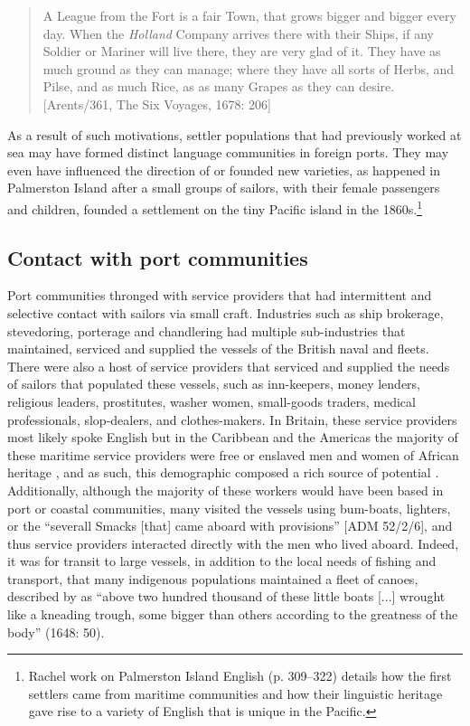 \begin{quotation}
A League from the Fort is a fair Town, that grows bigger and bigger every day. When the \textit{Holland} Company arrives there with their Ships, if any Soldier or Mariner will live there, they are very glad of it. They have as much ground as they can manage; where they have all sorts of Herbs, and Pilse, and as much Rice, as as many Grapes as they can desire. [Arents/361, The Six {Voyages, 1678}: 206]
\end{quotation}

As a result of such motivations, settler populations that had previously worked at sea may have formed distinct language communities in foreign ports. They may even have influenced the direction of  or founded new varieties, as happened in Palmerston Island after a small groups of sailors, with their female passengers and children, founded a settlement on the tiny Pacific island in the 1860s.\footnote{Rachel  work on Palmerston Island English (p. 309–322) details how the first settlers came from maritime communities and how their linguistic heritage gave rise to a variety of English that is unique in the Pacific.} 

\subsection{{Contact with port communities}}\label{sec:4.3.6}

Port communities thronged with service providers that had intermittent and selective contact with sailors via small craft. Industries such as ship brokerage, stevedoring, porterage and chandlering had multiple sub-industries that maintained, serviced and supplied the vessels of the British naval and  fleets. There were also a host of service providers that serviced and supplied the needs of sailors that populated these vessels, such as inn-keepers, money lenders, religious leaders, prostitutes, washer women, small-goods traders, medical professionals, slop-dealers, and clothes-makers. In Britain, these service providers most likely spoke English but in the Caribbean and the Americas the majority of these maritime service providers were free or enslaved men and women of African heritage \citep[259]{Jarvis2010}, and as such, this demographic composed a rich source of potential . Additionally, although the majority of these workers would have been based in port or coastal communities, many visited the vessels using bum-boats, lighters, or the “severall Smacks [that] came aboard with provisions” [ADM 52/2/6], and thus service providers interacted directly with the men who lived aboard. Indeed, it was for transit to large vessels, in addition to the local needs of fishing and transport, that many indigenous populations maintained a fleet of canoes, described by \citeauthor{Gage1648} as “above two hundred thousand of these little boats [...] wrought like a kneading trough, some bigger than others according to the greatness of the body” (1648: 50). 

